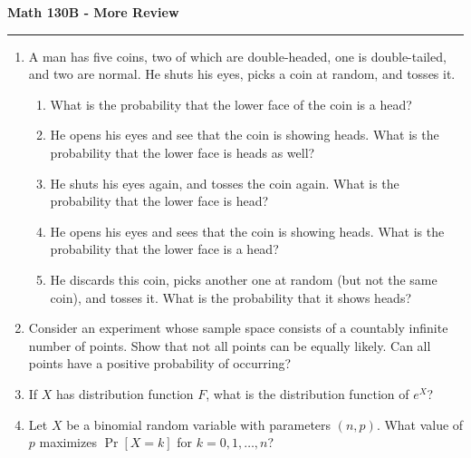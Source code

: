 \documentclass[11pt,letterpaper]{article}
\begin{document}
\begin{center}
{\bf \Large Math 130B - More Review}
\vspace{0.2cm}
\hrule
\end{center}


\begin{enumerate}
	\item  A man has five coins, two of which are double-headed, one is double-tailed, and two are normal. He shuts his eyes, picks a coin at random, and tosses it. 
	\begin{enumerate}
    	\item What is the probability that the lower face of the coin is a head?
    	\item He opens his eyes and see that the coin is showing heads. What is the probability that the lower face is heads as well? 
    	\item He shuts his eyes again, and tosses the coin again. What is the probability that the lower face is head?
    	\item He opens his eyes and sees that the coin is showing heads. What is the probability that the lower face is a head? 
    	\item He discards this coin, picks another one at random (but not the same coin), and tosses it. What is the probability that it shows heads?
	\end{enumerate}

	\item Consider an experiment whose sample space consists of a countably infinite number of points. Show that not all points can be equally likely. Can all points have a positive probability of occurring?

	\item If $X$ has distribution function $F$, what is the distribution function of $e^X$?

	\item Let $X$ be a binomial random variable with parameters $(n, p)$. What value of $p$ maximizes $\Pr[X =k]$ for $k = 0, 1, \ldots, n$?
\end{enumerate}
\end{document}
